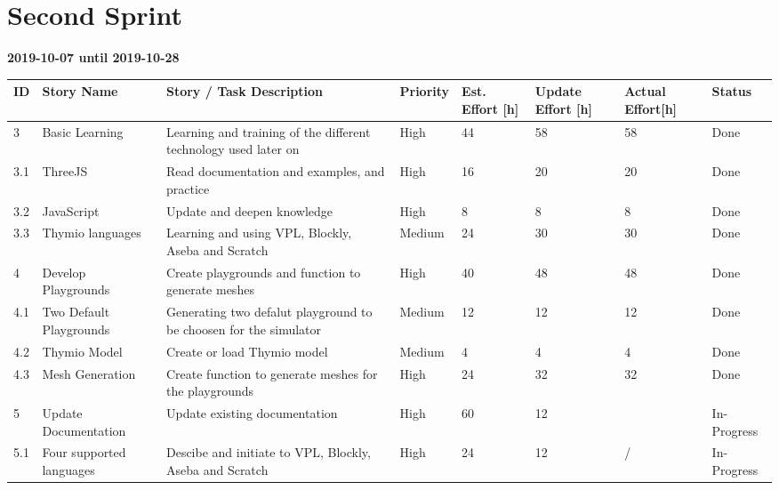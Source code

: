 \documentclass{scrbook}
\begin{document}
\section{Second Sprint}
\textbf{2019-10-07 until 2019-10-28}
\begin{longtable}{p{5mm}|p{2cm}|p{4cm}|p{1cm}|p{1cm}|p{1cm}|p{1cm}|p{15mm}}
  ID                     & Story Name & Story / Task Description & Priority & Est. Effort {[}h{]} & Update Effort {[}h{]} & Actual Effort{[}h{]} & Status                \\ \hline
  3 & Basic Learning & Learning and training of the different technology used later on & High & 44 & 58 & 58 & Done \\
  3.1 & ThreeJS & Read documentation and examples, and practice & High & 16 & 20 & 20 & Done \\ 
  3.2 & JavaScript & Update and deepen knowledge  & High & 8 & 8 & 8 & Done \\ 
  3.3 & Thymio languages & Learning and using VPL, Blockly, Aseba and Scratch & Medium & 24 & 30 & 30 & Done \\ 
  4 & Develop Playgrounds & Create playgrounds and function to generate meshes & High & 40 & 48 & 48 & Done \\ 
  4.1 & Two Default Playgrounds & Generating two defalut playground to be choosen for the simulator & Medium & 12 & 12 & 12 & Done \\ 
  4.2 & Thymio Model & Create or load Thymio model & Medium & 4 & 4 & 4 & Done \\ 
  4.3 & Mesh Generation & Create function to generate meshes for the playgrounds & High & 24 & 32 & 32 & Done \\ 
  5 & Update Documentation & Update existing documentation & High & 60 & 12 &  & In-Progress \\
  5.1 & Four supported languages & Descibe and initiate to VPL, Blockly, Aseba and Scratch & High & 24 & 12 & {/} & In-Progress \\ 
\end{longtable}
\end{document}
